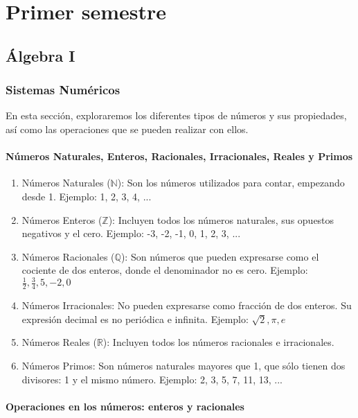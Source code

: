 \part{Primer semestre}
\chapter{Álgebra I}


\section{Sistemas Numéricos}%

En esta sección, exploraremos los diferentes tipos de números y sus propiedades, así como las operaciones que se pueden realizar con ellos.

\subsection{Números Naturales, Enteros, Racionales, Irracionales, Reales y Primos}

\begin{enumerate}
     \item Números Naturales (\(\mathbb{N}\)): Son los números utilizados para contar, empezando desde 1. Ejemplo: 1, 2, 3, 4, ...
     \item Números Enteros (\(\mathbb{Z}\)): Incluyen todos los números naturales, sus opuestos negativos y el cero. Ejemplo: -3, -2, -1, 0, 1, 2, 3, ...
     \item Números Racionales (\(\mathbb{Q}\)): Son números que pueden expresarse como el cociente de dos enteros, donde el denominador no es cero. Ejemplo: \(\frac{1}{2}, \frac{3}{4}, 5, -2, 0\)
     \item Números Irracionales: No pueden expresarse como fracción de dos enteros. Su expresión decimal es no periódica e infinita. Ejemplo: \(\sqrt{2}, \pi, e\)
     \item Números Reales (\(\mathbb{R}\)): Incluyen todos los números racionales e irracionales.
     \item Números Primos: Son números naturales mayores que 1, que sólo tienen dos divisores: 1 y el mismo número. Ejemplo: 2, 3, 5, 7, 11, 13, ...
    
\end{enumerate}
\subsection{Operaciones en los números: enteros y racionales}

